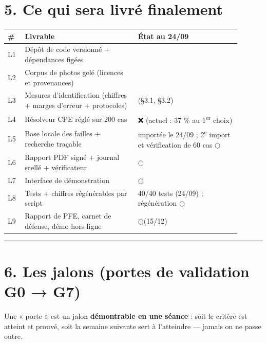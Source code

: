\documentclass[11pt,a4paper]{article}
\newcommand{\fait}{\textcolor{green!45!black}{\ding{51}}}      %
\newcommand{\encours}{\textcolor{blue!65!black}{\ding{46}}}   %
\newcommand{\afaire}{\textcolor{orange!85!black}{$\bigcirc$}}  %
\begin{document}
\section*{5. Ce qui sera livré finalement}
\sloppy
\begin{longtable}{|p{0.067\linewidth}|p{0.431\linewidth}|p{0.399\linewidth}|}
\hline
\textbf{\#} & \textbf{Livrable} & \textbf{État au 24/09} \\ \hline
\endhead
L1 & Dépôt de code versionné + dépendances figées & \fait \\ \hline
L2 & Corpus de photos gelé (licences et provenances) & \fait \\ \hline
L3 & Mesures d'identification (chiffres + marges d'erreur + protocoles) & \fait (§3.1, §3.2) \\ \hline
L4 & Résolveur CPE réglé sur 200 cas & ❌ (actuel : 37 \% au 1\textsuperscript{er} choix) \\ \hline
L5 & Base locale des failles + recherche traçable & \encours importée le 24/09 ; 2\textsuperscript{e} import et vérification de 60 cas \afaire \\ \hline
L6 & Rapport PDF signé + journal scellé + vérificateur & \afaire \\ \hline
L7 & Interface de démonstration & \afaire \\ \hline
L8 & Tests + chiffres régénérables par script & \encours 40/40 tests (24/09) ; régénération \afaire \\ \hline
L9 & Rapport de PFE, carnet de défense, démo hors-ligne & \afaire (15/12) \\ \hline
\end{longtable}
\medskip\hrule\medskip
\section*{6. Les jalons (portes de validation G0 → G7)}
Une « porte » est un jalon \textbf{démontrable en une séance} : soit le critère est atteint et prouvé, soit la semaine suivante sert à l'atteindre — jamais on ne passe outre.
\end{document}
